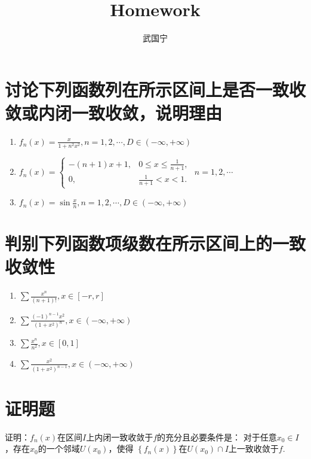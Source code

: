\documentclass[a4paper,12pt]{article}
\begin{document}
\title{Homework}
\author{武国宁}
\date{}
\maketitle

\section{讨论下列函数列在所示区间上是否一致收敛或内闭一致收敛，说明理由}
\begin{enumerate}[label={\rm(\arabic*)}]
    \item $\displaystyle f_n(x) = \frac{x}{1 + n^2x^2}, n = 1,2, \cdots, D \in (-\infty, +\infty)$
    \item $\displaystyle f_n(x) = \left\{\begin{array}{cl} 
             -(n+1)x+1, & 0 \le x \le \frac{1}{n+1}, \\
             0        , & \frac{1}{n+1} < x <1. 
            \end{array} \right.$
          $\displaystyle n = 1,2, \cdots$
      \item $\displaystyle f_n(x) = \sin \frac{x}{n}, n = 1, 2, \cdots,
          D \in \left(-\infty, +\infty\right)$
\end{enumerate}

\section{判别下列函数项级数在所示区间上的一致收敛性}
\begin{enumerate}[label={\rm(\arabic*)}]
    \item $\displaystyle \sum \frac{x^n}{(n+1)!}, x \in [-r, r]$
    \item $\displaystyle \sum \frac{(-1)^{n-1}x^2}{(1+x^2)^n}, x \in 
        \left(-\infty, +\infty\right)$
    \item $\displaystyle \sum \frac{x^n}{n^2}, x \in [0,1]$
    \item $\displaystyle \sum \frac{x^2}{(1+x^2)^{n-1}}, x \in 
        \left(-\infty, +\infty\right)$
\end{enumerate}
\section{证明题}
证明：$\displaystyle f_n(x)$在区间$I$上内闭一致收敛于$f$的充分且必要条件是：
对于任意$x_0 \in I$，存在$x_0$的一个邻域$\displaystyle U(x_0)$，使得
$\displaystyle \left\{f_n(x)\right\}$在$\displaystyle U(x_0) \cap I$上一致收敛于$f$.
\end{document}

